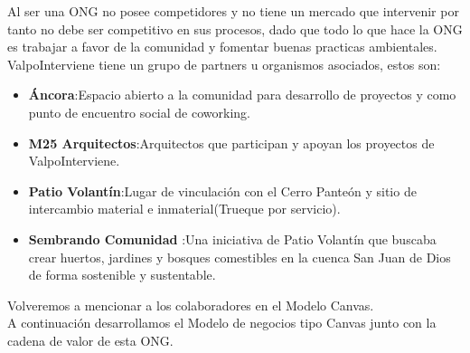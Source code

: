 \documentclass[paper=letter, fontsize=11pt]{scrartcl} %
\numberwithin{equation}{section} %
\numberwithin{figure}{section} %
\numberwithin{table}{section} %
\begin{document}
Al ser una ONG no posee competidores y no tiene un mercado que intervenir por tanto no debe ser competitivo en sus procesos, dado que todo lo que hace la ONG es trabajar a favor de la comunidad y fomentar buenas practicas ambientales.\\

ValpoInterviene tiene un grupo de partners u organismos asociados, estos son:
\begin{itemize}
\item \textbf{Áncora}:Espacio abierto a la comunidad para desarrollo de proyectos y como punto de encuentro social de coworking.
\item \textbf{M25 Arquitectos}:Arquitectos que participan y apoyan los proyectos de ValpoInterviene.
\item \textbf{Patio Volantín}:Lugar de vinculación con el Cerro Panteón y sitio de intercambio material e inmaterial(Trueque por servicio).
\item \textbf{Sembrando Comunidad} :Una iniciativa de Patio Volantín que buscaba crear huertos, jardines y bosques comestibles en la cuenca San Juan de Dios de forma sostenible y sustentable.
\end{itemize}
Volveremos a mencionar a los colaboradores en el Modelo Canvas.\\
A continuación desarrollamos el Modelo de negocios tipo Canvas junto con la cadena de valor de esta ONG.
\end{document}
